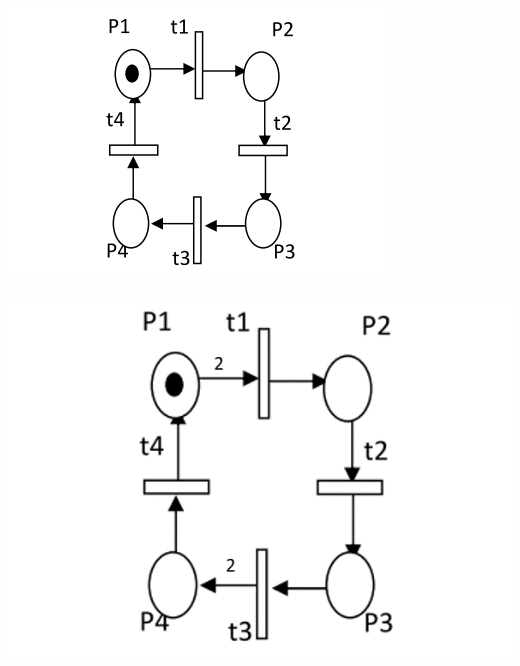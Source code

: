 \begin{definition}[Informelle]
 \begin{center}
	\includegraphics[scale=0.5]{img/rdp1.PNG}
	 \label{rdpo}
 \end{center}
 
 \begin{center}
	\includegraphics[scale=0.5]{img/rdpg.PNG}
	 \label{rdpg}
 \end{center}
\end{definition}

